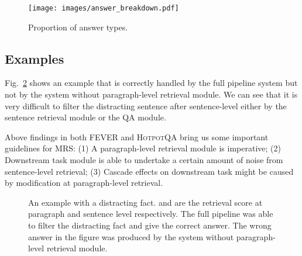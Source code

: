\documentclass[11pt,a4paper]{article}
\newcommand\fever{FEVER\xspace}
\newcommand\hpqa{\textsc{HotpotQA}\xspace}
\begin{document}
\begin{figure}[t]
	\centering
    \texttt{[image: images/answer\_breakdown.pdf]}
    \vspace{-10pt}
    \caption{Proportion of answer types.
    \label{fig:answer_type_breakdown}
}
\end{figure}

\subsection{Examples}
Fig.~\ref{fig:example} shows an example that is correctly handled by the full pipeline system but not by the system without paragraph-level retrieval module. We can see that it is very difficult to filter the distracting sentence after sentence-level either by the sentence retrieval module or the QA module.

Above findings in both \fever and \hpqa bring us some important guidelines for MRS:
(1) A paragraph-level retrieval module is imperative;
(2) Downstream task module is able to undertake a certain amount of noise from sentence-level retrieval;
(3) Cascade effects on downstream task might be caused by modification at paragraph-level retrieval.

\begin{figure}[t]
\vspace{-5pt}
\caption{An example with a distracting fact.  and  are the retrieval score at paragraph and sentence level respectively. The full pipeline was able to filter the distracting fact and give the correct answer. The wrong answer in the figure was produced by the system without paragraph-level retrieval module.}
\label{fig:example}
\vspace{-10pt}
\end{figure}
\end{document}
